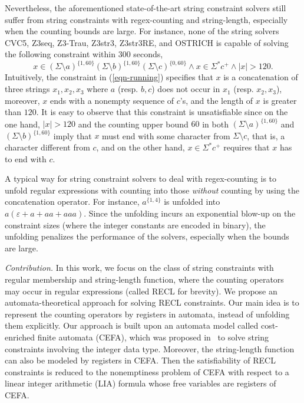 Nevertheless, the aforementioned state-of-the-art string constraint solvers still suffer from string constraints with regex-counting and string-length, especially when the counting bounds are large. For instance, none of the string solvers CVC5, Z3seq, Z3-Trau, Z3str3, Z3str3RE, and OSTRICH is capable of solving the following constraint within 300 seconds,
%
\begin{equation}\label{eqn-running}
x \in (\Sigma \setminus a)^{\{1, 60\}} (\Sigma \setminus b)^{\{1, 60\}} (\Sigma \setminus c)^{\{0, 60\}} \wedge x \in \Sigma^* c^+ \wedge |x| > 120.
\end{equation}
Intuitively, the constraint in (\ref{eqn-running}) specifies that $x$ is a concatenation of three strings $x_1, x_2, x_3$ where $a$ (resp. $b, c$) does not occur in $x_1$ (resp. $x_2, x_3$), moreover, $x$ ends with a nonempty sequence of $c$'s, and the length of $x$ is greater than $120$. It is easy to observe that this constraint is unsatisfiable since on the one hand, $|x| > 120$ and the counting upper bound $60$ in both $(\Sigma \setminus a)^{\{1, 60\}}$ and $(\Sigma \setminus b)^{\{1, 60\}}$ imply that $x$ must end with some character from $\Sigma \setminus c$, that is, a character different from $c$, and on the other hand, $x \in \Sigma^*c^+$ requires that $x$ has to end with $c$.

A typical way for string constraint solvers to deal with regex-counting is to unfold regular expressions with counting into those \emph{without} counting by using the concatenation operator. For instance, $a^{\{1, 4\}}$ is unfolded into $a(\varepsilon + a + aa + aaa)$. Since the unfolding incurs an exponential blow-up on the constraint sizes (where the integer constants are encoded in binary), the unfolding penalizes the performance of the solvers, especially when the bounds are large. 


\medskip
\noindent 
\emph{Contribution.} In this work, we focus on the class of string constraints with regular membership and string-length function, where the counting operators may occur in regular expressions (called RECL for brevity). We propose an automata-theoretical approach for solving RECL constraints. Our main idea is to represent the counting operators by registers in automata, instead of unfolding them explicitly. Our approach is built upon an automata model called cost-enriched finite automata (CEFA), which was proposed in~\cite{atva2020} to solve string constraints involving the integer data type. Moreover, the string-length function can also be modeled by registers in CEFA. Then the satisfiability of RECL constraints is reduced to the nonemptiness problem of CEFA with respect to a linear integer arithmetic (LIA) formula whose free variables are registers of CEFA. 


